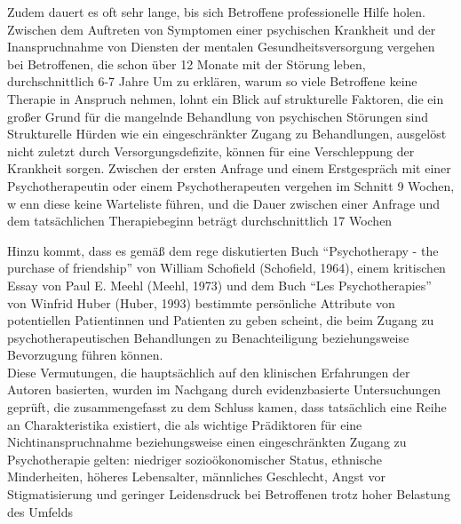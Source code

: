 Zudem dauert es oft sehr lange, bis sich Betroffene professionelle Hilfe holen. 
Zwischen dem Auftreten von Symptomen einer psychischen Krankheit und der Inanspruchnahme 
von Diensten der mentalen Gesundheitsversorgung vergehen bei Betroffenen, 
die schon über 12 Monate mit der Störung leben, durchschnittlich 6-7 Jahre 
\cite[]{mack_selfreported_2014} %
Um zu erklären, warum so viele Betroffene keine Therapie in Anspruch nehmen, 
lohnt ein Blick auf strukturelle Faktoren, die ein großer Grund für die mangelnde Behandlung 
von psychischen Störungen sind 
\cite[]{weisel_innovations_2021,straus_chancenungleichheit_2015}    \\ %
Strukturelle Hürden wie ein eingeschränkter Zugang zu Behandlungen, ausgelöst nicht zuletzt durch Versorgungsdefizite, 
können für eine Verschleppung der Krankheit sorgen. Zwischen der ersten Anfrage und einem Erstgespräch 
mit einer Psychotherapeutin oder einem Psychotherapeuten vergehen im Schnitt 9 Wochen, w
enn diese keine Warteliste führen, und die Dauer zwischen einer Anfrage 
und dem tatsächlichen Therapiebeginn beträgt durchschnittlich 17 Wochen 
\cite[]{straus_chancenungleichheit_2015} %

Hinzu kommt, dass es gemäß dem rege diskutierten Buch “Psychotherapy - the purchase of friendship” 
von William Schofield (Schofield, 1964), einem kritischen Essay von Paul E. Meehl (Meehl, 1973) 
und dem Buch “Les Psychotherapies” von Winfrid Huber (Huber, 1993) bestimmte persönliche Attribute 
von potentiellen Patientinnen und Patienten zu geben scheint, die beim Zugang zu psychotherapeutischen Behandlungen 
zu Benachteiligung beziehungsweise Bevorzugung führen können. \\
Diese Vermutungen, die hauptsächlich auf den klinischen Erfahrungen der Autoren basierten, 
wurden im Nachgang durch evidenzbasierte Untersuchungen geprüft, die zusammengefasst zu dem Schluss kamen, 
dass tatsächlich eine Reihe an Charakteristika existiert, 
die als wichtige Prädiktoren für eine Nichtinanspruchnahme beziehungsweise einen eingeschränkten Zugang 
zu Psychotherapie gelten: niedriger sozioökonomischer Status, ethnische Minderheiten, höheres Lebensalter, 
männliches Geschlecht, Angst vor Stigmatisierung und geringer Leidensdruck bei Betroffenen 
trotz hoher Belastung des Umfelds \cite[]{straus_chancenungleichheit_2015} %

